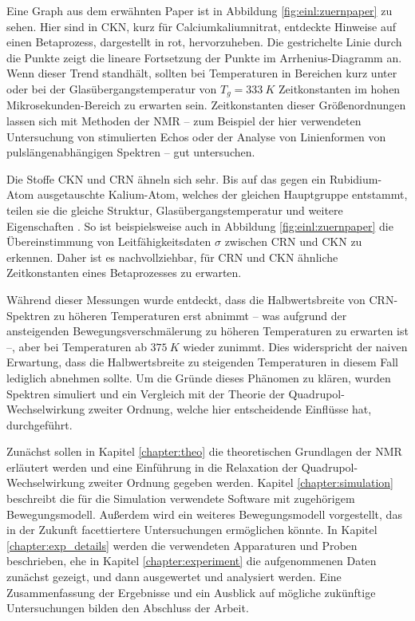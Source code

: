 Eine Graph aus dem erwähnten Paper ist in Abbildung \ref{fig:einl:zuernpaper} zu sehen. Hier sind in CKN, kurz für Calciumkaliumnitrat, entdeckte Hinweise auf einen Betaprozess, dargestellt in rot, hervorzuheben. Die gestrichelte Linie durch die Punkte zeigt die lineare Fortsetzung der Punkte im Arrhenius-Diagramm an. Wenn dieser Trend standhält, sollten bei Temperaturen in Bereichen kurz unter oder bei der Glasübergangstemperatur von $T_g = \SI{333}{K}$ Zeitkonstanten im hohen Mikrosekunden-Bereich zu erwarten sein. Zeitkonstanten dieser Größenordnungen lassen sich mit Methoden der NMR -- zum Beispiel der hier verwendeten Untersuchung von stimulierten Echos oder der Analyse von Linienformen von pulslängenabhängigen Spektren -- gut untersuchen.

Die Stoffe CKN und CRN ähneln sich sehr. Bis auf das gegen ein Rubidium-Atom ausgetauschte Kalium-Atom, welches der gleichen Hauptgruppe entstammt, teilen sie die gleiche Struktur, Glasübergangstemperatur und weitere Eigenschaften \cite{PIMENOV199793}. So ist beispielsweise auch in Abbildung \ref{fig:einl:zuernpaper} die Übereinstimmung von Leitfähigkeitsdaten $\sigma$ zwischen CRN und CKN zu erkennen. Daher ist es nachvollziehbar, für CRN und CKN ähnliche Zeitkonstanten eines Betaprozesses zu erwarten.

Während dieser Messungen wurde entdeckt, dass die Halbwertsbreite von CRN-Spektren zu höheren Temperaturen erst abnimmt -- was aufgrund der ansteigenden Bewegungsverschmälerung zu höheren Temperaturen zu erwarten ist --, aber bei Temperaturen ab $\SI{375}{K}$ wieder zunimmt. Dies widerspricht der naiven Erwartung, dass die Halbwertsbreite zu steigenden Temperaturen in diesem Fall lediglich abnehmen sollte. Um die Gründe dieses Phänomen zu klären, wurden Spektren simuliert und ein Vergleich mit der Theorie der Quadrupol-Wechselwirkung zweiter Ordnung, welche hier entscheidende Einflüsse hat, durchgeführt.


Zunächst sollen in Kapitel \ref{chapter:theo} die theoretischen Grundlagen der NMR erläutert werden und eine Einführung in die Relaxation der Quadrupol-Wechselwirkung zweiter Ordnung gegeben werden. Kapitel \ref{chapter:simulation} beschreibt die für die Simulation verwendete Software mit zugehörigem Bewegungsmodell. Außerdem wird ein weiteres Bewegungsmodell vorgestellt, das in der Zukunft facettiertere Untersuchungen ermöglichen könnte. In Kapitel \ref{chapter:exp_details} werden die verwendeten Apparaturen und Proben beschrieben, ehe in Kapitel \ref{chapter:experiment} die aufgenommenen Daten zunächst gezeigt, und dann ausgewertet und analysiert werden. Eine Zusammenfassung der Ergebnisse und ein Ausblick auf mögliche zukünftige Untersuchungen bilden den Abschluss der Arbeit.
